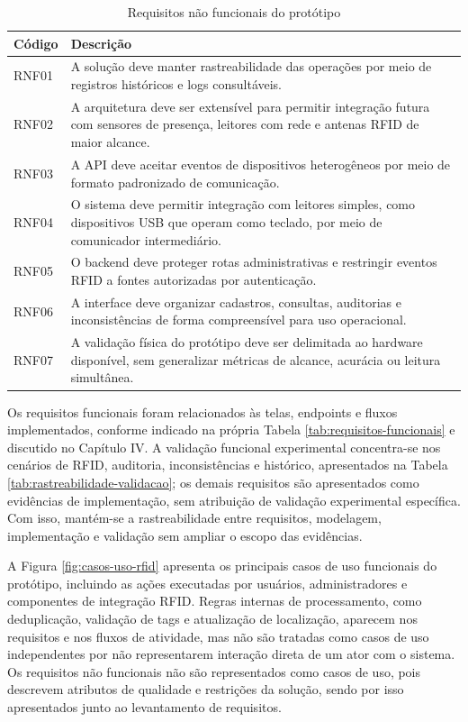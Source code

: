 \begin{table}[H]
\centering
\footnotesize
\setlength{\tabcolsep}{4pt}
\renewcommand{\arraystretch}{1.12}
\caption{Requisitos não funcionais do protótipo}
\label{tab:requisitos-nao-funcionais}
\begin{tabularx}{\textwidth}{>{\raggedright\arraybackslash}p{1.5cm}>{\raggedright\arraybackslash}X}
\toprule
\textbf{Código} & \textbf{Descrição} \\
\midrule
RNF01 & A solução deve manter rastreabilidade das operações por meio de registros históricos e logs consultáveis. \\
RNF02 & A arquitetura deve ser extensível para permitir integração futura com sensores de presença, leitores com rede e antenas RFID de maior alcance. \\
RNF03 & A API deve aceitar eventos de dispositivos heterogêneos por meio de formato padronizado de comunicação. \\
RNF04 & O sistema deve permitir integração com leitores simples, como dispositivos USB que operam como teclado, por meio de comunicador intermediário. \\
RNF05 & O backend deve proteger rotas administrativas e restringir eventos RFID a fontes autorizadas por autenticação. \\
RNF06 & A interface deve organizar cadastros, consultas, auditorias e inconsistências de forma compreensível para uso operacional. \\
RNF07 & A validação física do protótipo deve ser delimitada ao hardware disponível, sem generalizar métricas de alcance, acurácia ou leitura simultânea. \\
\bottomrule
\end{tabularx}
\end{table}

Os requisitos funcionais foram relacionados às telas, endpoints e fluxos implementados, conforme indicado na própria Tabela \ref{tab:requisitos-funcionais} e discutido no Capítulo IV. A validação funcional experimental concentra-se nos cenários de RFID, auditoria, inconsistências e histórico, apresentados na Tabela \ref{tab:rastreabilidade-validacao}; os demais requisitos são apresentados como evidências de implementação, sem atribuição de validação experimental específica. Com isso, mantém-se a rastreabilidade entre requisitos, modelagem, implementação e validação sem ampliar o escopo das evidências.

A Figura \ref{fig:casos-uso-rfid} apresenta os principais casos de uso funcionais do protótipo, incluindo as ações executadas por usuários, administradores e componentes de integração RFID. Regras internas de processamento, como deduplicação, validação de tags e atualização de localização, aparecem nos requisitos e nos fluxos de atividade, mas não são tratadas como casos de uso independentes por não representarem interação direta de um ator com o sistema. Os requisitos não funcionais não são representados como casos de uso, pois descrevem atributos de qualidade e restrições da solução, sendo por isso apresentados junto ao levantamento de requisitos.

